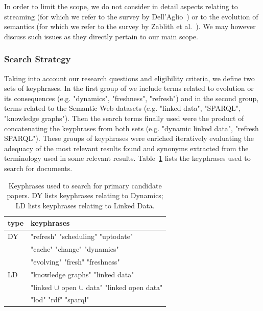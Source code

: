 \documentclass[sw]{iosart2x}
\begin{document}
In order to limit the scope, we do not consider in detail aspects relating to streaming (for which we refer to the survey by Dell'Aglio~\cite{DellAglioVHB17}) or to the evolution of semantics (for which we refer to the survey by Zablith et al.~\cite{ZablithAdFKMPS15}). We may however discuss such issues as they directly pertain to our main scope.

\subsubsection{Search Strategy}\label{Search}

Taking into account our research questions and eligibility criteria, we define two sets of keyphrases. In the first group of we include terms related to evolution or its consequences (e.g. "dynamics", "freshness", "refresh") and in the second group, terms related to the Semantic Web datasets (e.g. "linked data", "SPARQL", "knowledge graphs"). Then the search terms finally used were the product of concatenating the keyphrases from both sets (e.g. "dynamic linked data", "refresh SPARQL"). These groups of keyphrases were enriched iteratively evaluating the adequacy of the most relevant results found and synonyms extracted from the terminology used in some relevant results. Table~\ref{tab:terms} lists the keyphrases used to search for documents.


\begin{table}[]
	\centering
	\caption{Keyphrases used to search for primary candidate papers. DY lists keyphrases relating to Dynamics; LD lists keyphrases relating to Linked Data.}
	\label{tab:terms}
	\begin{tabular}{ll} 
		\hline
		type & keyphrases  \\ \hline
		DY    & "refresh"
		"scheduling"
		"uptodate" \\ &
		"cache"
		"change"
		"dynamics" \\ &
		"evolving"
		"fresh"
		"freshness"            \\ \hline
		LD    & "knowledge graphs"
		"linked data" \\ &
		"linked $\cup$ open $\cup$ data"
		"linked open data" \\ &
		"lod"
		"rdf"
		"sparql"           \\ \hline
	\end{tabular}
\end{table}

\end{document}
